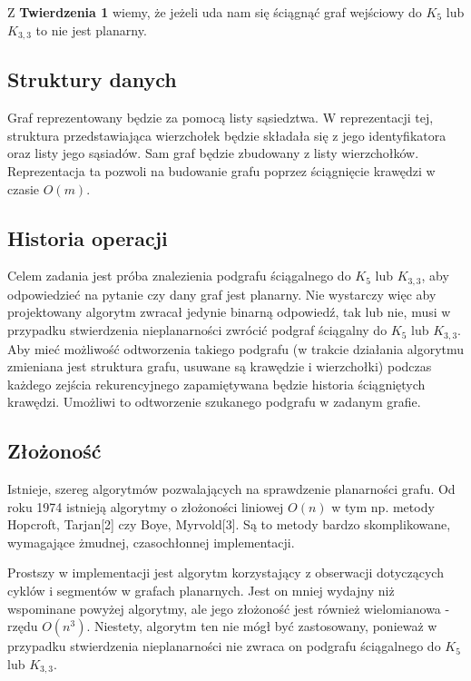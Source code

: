 \documentclass[a4 122pt]{article}
\begin{document}
		Z \textbf{Twierdzenia 1} wiemy, że jeżeli uda nam się ściągnąć graf wejściowy do $K_5$ lub $K_{3,3}$ to nie jest planarny. 
	
	\subsection{Struktury danych}

		Graf reprezentowany będzie za pomocą listy sąsiedztwa. 
		W reprezentacji tej, struktura przedstawiająca wierzchołek będzie składała się z jego identyfikatora oraz listy jego sąsiadów. 
		Sam graf będzie zbudowany z listy wierzchołków. 
		Reprezentacja ta pozwoli na budowanie grafu poprzez ściągnięcie krawędzi w czasie $O(m)$.
	
	\subsection{Historia operacji}
		Celem zadania jest próba znalezienia podgrafu ściągalnego do $K_5$ lub $K_{3,3}$, aby odpowiedzieć na pytanie czy dany graf jest planarny. 
		Nie wystarczy więc aby projektowany algorytm zwracał jedynie binarną odpowiedź, tak lub nie, musi w przypadku stwierdzenia nieplanarności zwrócić podgraf ściągalny do $K_5$ lub $K_{3,3}$.
		Aby mieć możliwość odtworzenia takiego podgrafu (w trakcie działania algorytmu zmieniana jest struktura grafu, usuwane są krawędzie i wierzchołki) podczas każdego zejścia rekurencyjnego zapamiętywana będzie historia ściągniętych krawędzi. 
		Umożliwi to odtworzenie szukanego podgrafu w zadanym grafie.
	
	\subsection{Złożoność}
	
		Istnieje, szereg algorytmów pozwalających na sprawdzenie planarności grafu.
		Od roku 1974 istnieją algorytmy o złożoności liniowej $O(n)$ w tym np. metody Hopcroft, Tarjan[2] czy Boye, Myrvold[3].
		Są to metody bardzo skomplikowane, wymagające żmudnej, czasochłonnej implementacji.
		
		Prostszy w implementacji jest algorytm korzystający z obserwacji dotyczących cyklów i segmentów w grafach planarnych. 
		Jest on mniej wydajny niż wspominane powyżej algorytmy, ale jego złożoność jest również wielomianowa - rzędu $O(n^3)$. 
		Niestety, algorytm ten nie mógł być zastosowany, ponieważ w przypadku stwierdzenia nieplanarności nie zwraca on podgrafu ściągalnego do $K_5$ lub $K_{3, 3}$.
		
\end{document}

